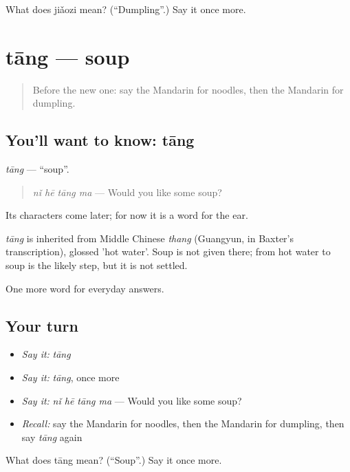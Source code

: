 \begin{tcolorbox}[breakable,colback=teal!4,colframe=teal!35!black,title={Before you move on}]
What does jiǎozi mean? (\textquotedblleft{}Dumpling\textquotedblright{}.) Say it once more.
\end{tcolorbox}
\section[tāng]{tāng — soup}

\label{lesson:ZH-C70-tang}



\begin{quote}
Before the new one: say the Mandarin for noodles, then the Mandarin for dumpling.
\end{quote}

\subsection*{You'll want to know: tāng}
\emph{tāng} — \textquotedblleft{}soup\textquotedblright{}.

\begin{quote}
\emph{nǐ hē tāng ma} — Would you like some soup?
\end{quote}

Its characters come later; for now it is a word for the ear.

\begin{cousinweb}
\emph{tāng} is inherited from Middle Chinese \emph{thang} (Guangyun, in Baxter's transcription), glossed 'hot water'. Soup is not given there; from hot water to soup is the likely step, but it is not settled.
\end{cousinweb}

\begin{grammarlens}[title={What you've built}]
One more word for everyday answers.
\end{grammarlens}

\subsection*{Your turn}
\begin{itemize}
\raggedright
  \item \emph{Say it:} \emph{tāng}
  \item \emph{Say it:} \emph{tāng}, once more
  \item \emph{Say it:} \emph{nǐ hē tāng ma} — Would you like some soup?
  \item \emph{Recall:} say the Mandarin for noodles, then the Mandarin for dumpling, then say \emph{tāng} again
\end{itemize}

\begin{tcolorbox}[breakable,colback=teal!4,colframe=teal!35!black,title={Before you move on}]
What does tāng mean? (\textquotedblleft{}Soup\textquotedblright{}.) Say it once more.
\end{tcolorbox}
